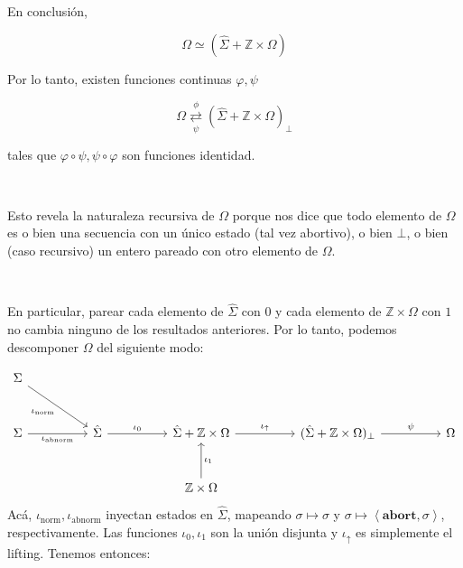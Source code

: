 \documentclass[article, 12pt]{article}
\begin{document}
~

~ 

~ 


~ 

En conclusión,

\begin{equation*}
  \Omega \simeq \left( \hat{\Sigma} + \mathbb{Z} \times \Omega \right) 
\end{equation*}

Por lo tanto, existen funciones continuas $\varphi, \psi$

\begin{equation*}
  \Omega 
\underset{\psi}{\overset{\phi}{\rightleftarrows}} 
\left( \hat{\Sigma} + \mathbb{Z} \times \Omega \right)_{\perp}
\end{equation*}

tales que $\varphi \circ \psi, \psi \circ \varphi$ son funciones identidad.

~

\begin{helpframe}
  Esto revela la naturaleza recursiva de $\Omega$ porque nos dice que todo
  elemento de $\Omega$ es o bien una secuencia con un único estado (tal vez
  abortivo), o bien $\bot$, o bien (caso recursivo) un entero pareado con otro
  elemento de $\Omega$.
\end{helpframe}

~

En particular, parear cada elemento de $\hat{\Sigma}$ con $0$ y cada elemento de
$\mathbb{Z} \times \Omega$ con $1$ no cambia ninguno de los resultados
anteriores. Por lo tanto, podemos descomponer $\Omega$ del siguiente modo:

\[
\begin{tikzcd}[row sep=large, column sep=huge]
\Sigma \arrow[dr, "\iota_{\text{norm}}"'] & \\
\Sigma \arrow[r, "\iota_{\text{abnorm}}"'] & \hat{\Sigma} \arrow[r, "\iota_0"] &
\hat{\Sigma}+ \mathbb{Z} \times \Omega \arrow[r, "\iota_{\uparrow}"] & (\hat{\Sigma} + \mathbb{Z} \times \Omega)_{\perp} \arrow[r, "\psi"] & \Omega \\
& & \mathbb{Z} \times \Omega \arrow[u, "\iota_1"']
\end{tikzcd}
\]
Acá, $\iota_{\text{norm}}, \iota_{\text{abnorm}}$ inyectan estados en
$\hat{\Sigma}$, mapeando $\sigma \mapsto \sigma$ y $\sigma \mapsto
\left<\textbf{abort}, \sigma \right>$, respectivamente. Las funciones $\iota_0,
\iota_1$ son la unión disjunta y $\iota_\uparrow$ es simplemente el lifting.
Tenemos entonces:
\end{document}
